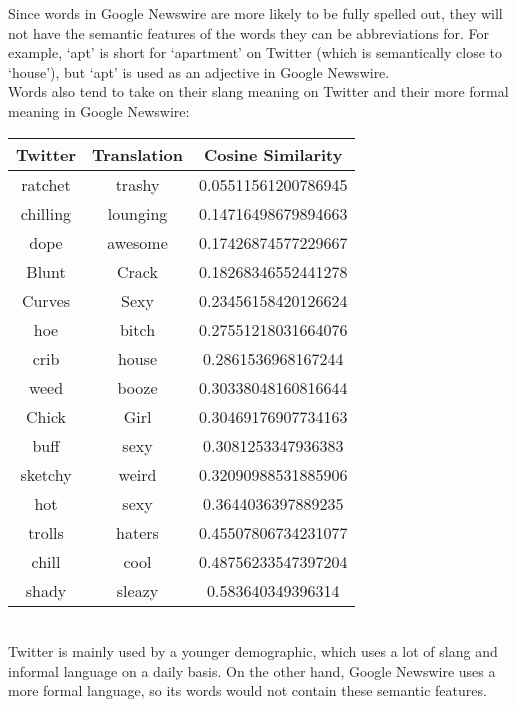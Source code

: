 \documentclass[11pt,a4paper]{article}
\begin{document}
Since words in Google Newswire are more likely to be fully spelled out, they will not have the semantic features of the words they can be abbreviations for. For example, `apt' is short for `apartment' on Twitter (which is semantically close to `house'), but `apt' is used as an adjective in Google Newswire.\\
Words also tend to take on their slang meaning on Twitter and their more formal meaning in Google Newswire:
\begin{table}[!htb]
\begin{tabular}{|c|c|c|}
\hline
Twitter & Translation & Cosine Similarity \\
\hline
ratchet & trashy & 0.05511561200786945 \\
chilling & lounging & 0.14716498679894663 \\
dope & awesome & 0.17426874577229667 \\
Blunt & Crack & 0.18268346552441278 \\
Curves & Sexy & 0.23456158420126624 \\
hoe & bitch & 0.27551218031664076 \\
crib & house & 0.2861536968167244 \\
weed & booze & 0.30338048160816644 \\
Chick & Girl & 0.30469176907734163 \\
buff & sexy & 0.3081253347936383 \\
sketchy & weird & 0.32090988531885906 \\
hot & sexy & 0.3644036397889235 \\
trolls & haters & 0.45507806734231077 \\
chill & cool & 0.48756233547397204 \\
shady & sleazy & 0.583640349396314 \\
\hline
\end{tabular}
\end{table}\\
Twitter is mainly used by a younger demographic, which uses a lot of slang and informal language on a daily basis. On the other hand, Google Newswire uses a more formal language, so its words would not contain these semantic features.
\end{document}

